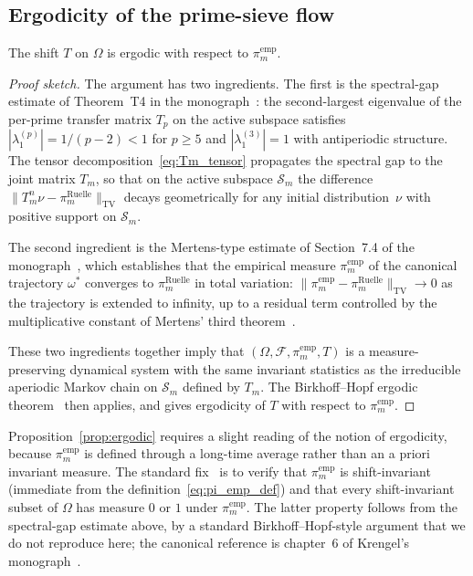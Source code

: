 \subsection{Ergodicity of the prime-sieve flow}
\label{ssec:ergodicity}

\begin{proposition}
\label{prop:ergodic}
The shift $T$ on $\Omega$ is ergodic with respect to
$\pi_m^{\mathrm{emp}}$.
\end{proposition}

\begin{proof}[Proof sketch]
The argument has two ingredients. The first is the spectral-gap
estimate of Theorem~T4 in the
monograph~\cite[Ch.~7,~Thm.~T4]{PT_Monograph}: the second-largest
eigenvalue of the per-prime transfer matrix $T_p$ on the active
subspace satisfies $|\lambda^{(p)}_1| = 1/(p-2) < 1$ for $p \geq 5$
and $|\lambda^{(3)}_1| = 1$ with antiperiodic structure. The
tensor decomposition~\eqref{eq:Tm_tensor} propagates the spectral
gap to the joint matrix $T_m$, so that on the active subspace
$\mathcal{S}_m$ the difference
$\|T_m^n \nu - \pi_m^{\mathrm{Ruelle}}\|_{\mathrm{TV}}$ decays
geometrically for any initial distribution~$\nu$ with positive
support on $\mathcal{S}_m$.

The second ingredient is the Mertens-type estimate of
Section~7.4 of the monograph~\cite{PT_Monograph}, which
establishes that the empirical measure $\pi_m^{\mathrm{emp}}$ of
the canonical trajectory $\omega^\ast$ converges to
$\pi_m^{\mathrm{Ruelle}}$ in total variation:
$\|\pi_m^{\mathrm{emp}} - \pi_m^{\mathrm{Ruelle}}\|_{\mathrm{TV}} \to 0$
as the trajectory is extended to infinity, up to a residual term
controlled by the multiplicative constant of Mertens' third
theorem~\cite[Ch.~22]{Davenport2000}.

These two ingredients together imply that
$(\Omega, \mathcal{F}, \pi_m^{\mathrm{emp}}, T)$ is a measure-preserving
dynamical system with the same invariant statistics as the
irreducible aperiodic Markov chain on $\mathcal{S}_m$ defined by
$T_m$. The Birkhoff--Hopf ergodic
theorem~\cite[Thm.~1.6]{Walters1982} then applies, and gives
ergodicity of $T$ with respect to $\pi_m^{\mathrm{emp}}$.
\end{proof}

\begin{remark}
\label{rmk:precise_ergodicity}
Proposition~\ref{prop:ergodic} requires a slight reading of the
notion of ergodicity, because $\pi_m^{\mathrm{emp}}$ is defined
through a long-time average rather than an a priori invariant
measure. The standard fix~\cite[Ch.~1.6,~Remark~1]{Walters1982} is
to verify that $\pi_m^{\mathrm{emp}}$ is shift-invariant
(immediate from the definition~\eqref{eq:pi_emp_def}) and that
every shift-invariant subset of $\Omega$ has measure $0$ or $1$
under $\pi_m^{\mathrm{emp}}$. The latter property follows from the
spectral-gap estimate above, by a standard Birkhoff--Hopf-style
argument that we do not reproduce here; the canonical reference is
chapter~6 of Krengel's monograph~\cite{KrengelBook}.
\end{remark}

